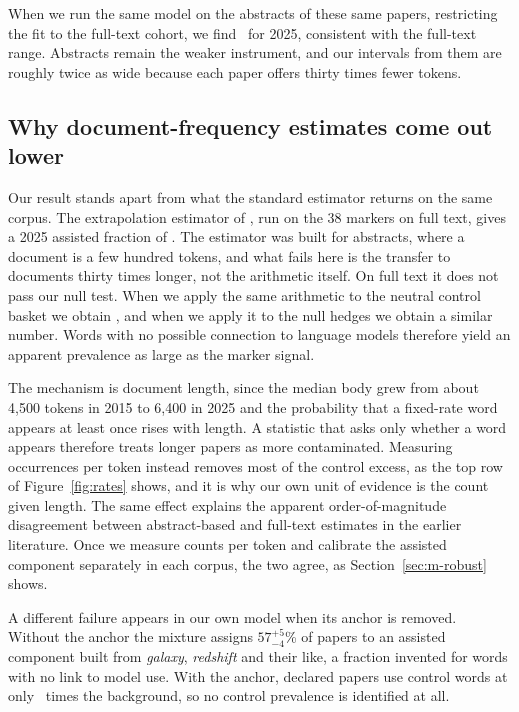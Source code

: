 \documentclass[twocolumn]{aastex631}
\begin{document}
When we run the same model on the abstracts of these same papers, restricting the fit to the full-text cohort, we find \piAbstractsCohort\ for 2025, consistent with the full-text range. Abstracts remain the weaker instrument, and our intervals from them are roughly twice as wide because each paper offers thirty times fewer tokens.

\subsection{Why document-frequency estimates come out lower}\label{sec:m-compare}

Our result stands apart from what the standard estimator returns on the same corpus. The extrapolation estimator of \citet{Holzwarth2026}, run on the 38 markers on full text, gives a 2025 assisted fraction of \betaMarkersFull. The estimator was built for abstracts, where a document is a few hundred tokens, and what fails here is the transfer to documents thirty times longer, not the arithmetic itself. On full text it does not pass our null test. When we apply the same arithmetic to the neutral control basket we obtain \ctrlBetaFull, and when we apply it to the null hedges we obtain a similar number. Words with no possible connection to language models therefore yield an apparent prevalence as large as the marker signal.

The mechanism is document length, since the median body grew from about 4{,}500 tokens in 2015 to 6{,}400 in 2025 and the probability that a fixed-rate word appears at least once rises with length. A statistic that asks only whether a word appears therefore treats longer papers as more contaminated. Measuring occurrences per token instead removes most of the control excess, as the top row of Figure~\ref{fig:rates} shows, and it is why our own unit of evidence is the count given length. The same effect explains the apparent order-of-magnitude disagreement between abstract-based and full-text estimates in the earlier literature. Once we measure counts per token and calibrate the assisted component separately in each corpus, the two agree, as Section~\ref{sec:m-robust} shows.

A different failure appears in our own model when its anchor is removed. Without the anchor the mixture assigns $57^{+5}_{-4}$\% of papers to an assisted component built from \textit{galaxy}, \textit{redshift} and their like, a fraction invented for words with no link to model use. With the anchor, declared papers use control words at only \anchorRangeControls\ times the background, so no control prevalence is identified at all.
\end{document}
